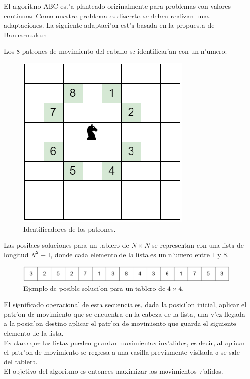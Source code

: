 \documentclass[12pt]{article}
\begin{document}
    El algoritmo ABC est'a planteado originalmente para problemas con valores continuos. Como nuestro problema es discreto
    se deben realizan unas adaptaciones. La siguiente adaptaci'on est'a basada en la propuesta de Banharnsakun \cite{anan}.


    Los 8 patrones de movimiento del caballo se identificar'an con un n'umero:
    \begin{figure}[H]
        \centering
        \includegraphics[scale=0.5]{id_move.png}
        \caption{Identificadores de los patrones.}
        \label{fig:id_move}
    \end{figure}



    Las posibles  soluciones para un tablero de $N \times N$
    se representan con una lista de longitud $N^{2} -1 $, donde
    cada elemento de la lista es un n'umero entre $1$ y $8$.

    \begin{figure}[H]
        \centering
        \includegraphics[scale=0.3]{food_source1.png}
        \caption{Ejemplo de posible soluci'on para un tablero de $4\times 4$.}
        \label{fig:food_source1}
    \end{figure}

    El significado operacional de esta secuencia es, dada la posici'on inicial, aplicar el patr'on de movimiento
    que se encuentra en la cabeza de la lista, una v'ez llegada a la posici'on destino aplicar el
    patr'on de movimiento que guarda el siguiente elemento de la lista. \\
    Es claro que las listas pueden guardar movimientos inv'alidos, es decir, al aplicar
    el patr'on de movimiento se regresa a una casilla previamente visitada o se sale del tablero. \\
    El objetivo del algoritmo es entonces maximizar los movimientos v'alidos.
\end{document}
